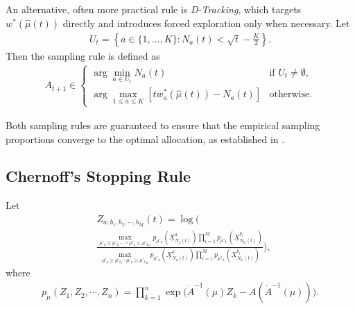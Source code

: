 \documentclass[final]{IEEEtran}
\newcommand{\nn}{\nonumber}
\begin{document}
An alternative, often more practical rule is \emph{D-Tracking}, which targets \( w^*(\hat{\mu}(t)) \) directly and introduces forced exploration only when necessary. Let
\begin{align}
U_t = \left\{ a \in \{1, \dots, K\} : N_a(t) < \sqrt{t} - \frac{K}{2} \right\}.
\end{align}
Then the sampling rule is defined as
\begin{align}
A_{t+1} \in 
\begin{cases}
\arg\min_{a \in U_t} N_a(t) & \text{if } U_t \neq \emptyset, \\
\arg\max_{1 \leq a \leq K} \left[ t w^*_a(\hat{\mu}(t)) - N_a(t) \right] & \text{otherwise}.
\end{cases}
\end{align}

Both sampling rules are guaranteed to ensure that the empirical sampling proportions converge to the optimal allocation, as established in \cite[Section 3.1]{garivier2016optimal}.

\subsection{Chernoff's Stopping Rule}
Let
\begin{align}
&Z_{a; b_1,b_2,\cdots,b_M}(t)=\log\bigg( \nn\\
& \frac{\max_{\mu'_a\leq \mu'_{b_1}   \cdots \wedge \mu'_a \leq \mu'_{b_M} }p_{\mu'_a}(\underline{X}_{N_a(t)}^a)  \prod_{i=1}^M p_{\mu'_{b_i}}(\underline{X}_{N_{b_i}(t)}^{b_i}) }{\max_{\mu'_a\geq \mu'_{b_1}  \cdots \mu'_a\geq \mu'_{b_M} }p_{\mu'_a}(\underline{X}_{N_a(t)}^a)  \prod_{i=1}^M p_{\mu'_{b_i}}(\underline{X}_{N_{b_i}(t)}^{b_i})}\bigg) \label{estim},
\end{align}
where
\begin{align}
p_{\mu}(Z_1,Z_2,\cdots,Z_n)=\prod_{k=1}^n \exp\big(\dot{A}^{-1}(\mu) Z_k-A(\dot{A}^{-1}(\mu))\big). 
\end{align}
\end{document}
